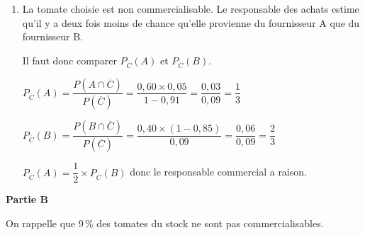 \begin{enumerate}
\begin{enumerate}
		\item La tomate choisie est non commercialisable. Le responsable des achats estime qu'il y a deux fois moins de chance qu'elle provienne du fournisseur A que du fournisseur B.%
		
Il faut donc comparer $P_{\overline{C}}\left (A\right )$ et  $P_{\overline{C}}\left (B\right )$.

$P_{\overline{C}}\left (A\right ) = \dfrac{P\left ( A \cap \overline{C}\right )}{P\left (\overline{C}\right )}
= \dfrac{0,60\times 0,05}{1-0,91} = \dfrac{0,03}{0,09}= \dfrac{1}{3}$ 

$P_{\overline{C}}\left (B\right ) = \dfrac{P\left ( B \cap \overline{C}\right )}{P\left (\overline{C}\right )}
= \dfrac{0,40\times \left (1-0,85\right )}{0,09} = \dfrac{0,06}{0,09}= \dfrac{2}{3}$ 

$P_{\overline{C}}\left (A\right ) = \dfrac{1}{2}\times P_{\overline{C}}\left (B\right )$ donc le responsable commercial a raison.

	\end{enumerate}
\end{enumerate}

\bigskip

\textbf{Partie B}

\medskip

On rappelle que 9\,\% des tomates du stock ne sont pas commercialisables.

\medskip

